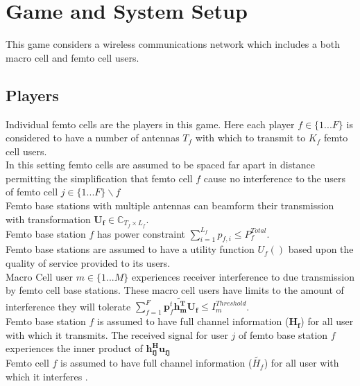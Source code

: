 \documentclass[12pt]{article}
\begin{document}
\section{Game and System Setup}

This game considers a wireless communications network which includes a both macro cell and femto cell users.

\subsection{Players}

Individual femto cells are the players in this game.
Here each player  $f \in \{1 ... F\}$ is considered to have a number of antennas $T_f$ with which to transmit to $K_f$ femto cell users.
\\

In this setting femto cells are assumed to be spaced far apart in distance permitting the simplification that 
femto cell $f$ cause no interference to the users of femto cell $j \in \{1 ... F\}\backslash f$
\\


Femto base stations with multiple antennas can beamform their transmission with transformation $\mathbf{U_f} \in \mathbb{C}_{T_f \times L_f}$.
\\

Femto base station $f$ has power constraint  $\sum^{L_f}_{i=1} p_{f,i} \leq P^{Total}_{f} $. 
\\

Femto base stations are assumed to have a utility function $U_f()$ based upon the quality of service provided to its users.
\\

Macro Cell user $m \in \{1 ... M\}$ experiences receiver interference to due transmission by  femto cell base stations. These macro cell users have limits to the amount of interference they will tolerate 
$\sum^F_{f=1} \mathbf{p}_f^t \mathbf{\tilde{h_m^T}}  \mathbf{U_f}  \leq I^{Threshold}_{m} $.
\\

Femto base station $f$ is assumed to have full channel information ($\mathbf{H_f}$) for all user  with which it transmits. The received signal for user $j$ of femto base station $f$ experiences the inner product of $\mathbf{h^H_{fj}u_{fj}}$
\\


Femto cell $f$ is assumed to have full channel information ($\tilde{H_f}$) for all user with which it interferes .
\\
\end{document}
